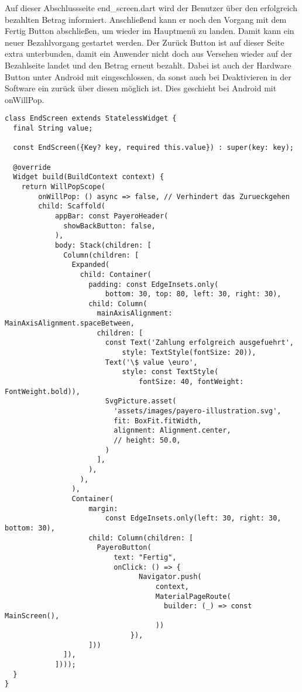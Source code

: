 Auf dieser Abschlussseite \glqq end\_screen.dart\grqq{} wird der Benutzer über den erfolgreich bezahlten Betrag informiert.
Anschließend kann er noch den Vorgang mit dem \glqq Fertig\grqq{} Button abschließen, um wieder im Hauptmenü zu landen.
Damit kann ein neuer Bezahlvorgang gestartet werden.
Der \glqq Zurück\grqq{} Button ist auf dieser Seite extra unterbunden, damit ein Anwender nicht doch aus Versehen wieder auf der Bezahlseite landet und den Betrag erneut bezahlt.
Dabei ist auch der Hardware Button unter Android mit eingeschlossen, da sonst auch bei Deaktivieren in der Software ein zurück über diesen möglich ist.
Dies geschieht bei Android mit \glqq onWillPop\grqq{}.

\begin{lstlisting}[caption={EndScreen bei erfolgreichem Bezahlvorgang}]
  class EndScreen extends StatelessWidget {
  final String value;

  const EndScreen({Key? key, required this.value}) : super(key: key);

  @override
  Widget build(BuildContext context) {
    return WillPopScope(
        onWillPop: () async => false, // Verhindert das Zurueckgehen
        child: Scaffold(
            appBar: const PayeroHeader(
              showBackButton: false,
            ),
            body: Stack(children: [
              Column(children: [
                Expanded(
                  child: Container(
                    padding: const EdgeInsets.only(
                        bottom: 30, top: 80, left: 30, right: 30),
                    child: Column(
                      mainAxisAlignment: MainAxisAlignment.spaceBetween,
                      children: [
                        const Text('Zahlung erfolgreich ausgefuehrt',
                            style: TextStyle(fontSize: 20)),
                        Text('\$ value \euro',
                            style: const TextStyle(
                                fontSize: 40, fontWeight: FontWeight.bold)),
                        SvgPicture.asset(
                          'assets/images/payero-illustration.svg',
                          fit: BoxFit.fitWidth,
                          alignment: Alignment.center,
                          // height: 50.0,
                        )
                      ],
                    ),
                  ),
                ),
                Container(
                    margin:
                        const EdgeInsets.only(left: 30, right: 30, bottom: 30),
                    child: Column(children: [
                      PayeroButton(
                          text: "Fertig",
                          onClick: () => {
                                Navigator.push(
                                    context,
                                    MaterialPageRoute(
                                      builder: (_) => const MainScreen(),
                                    ))
                              }),
                    ]))
              ]),
            ])));
  }
}
\end{lstlisting}

